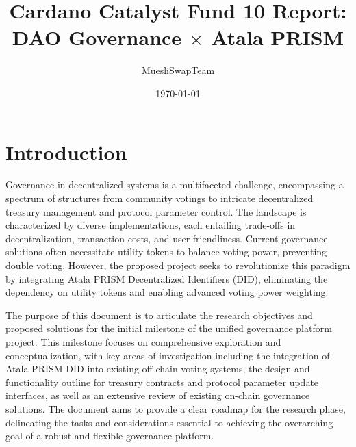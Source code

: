 \documentclass[11pt]{article}
\title{Cardano Catalyst Fund 10 Report:\\DAO Governance $\times$ Atala PRISM}
\author{MuesliSwapTeam}
\date{\today}
\begin{document}
\maketitle
\vspace{10em}
\tableofcontents
\newpage

\section{Introduction}
Governance in decentralized systems is a multifaceted challenge, encompassing a spectrum of structures from community votings to intricate decentralized treasury management and protocol parameter control. The landscape is characterized by diverse implementations, each entailing trade-offs in decentralization, transaction costs, and user-friendliness. Current governance solutions often necessitate utility tokens to balance voting power, preventing double voting. However, the proposed project seeks to revolutionize this paradigm by integrating Atala PRISM Decentralized Identifiers (DID), eliminating the dependency on utility tokens and enabling advanced voting power weighting.

The purpose of this document is to articulate the research objectives and proposed solutions for the initial milestone of the unified governance platform project. This milestone focuses on comprehensive exploration and conceptualization, with key areas of investigation including the integration of Atala PRISM DID into existing off-chain voting systems, the design and functionality outline for treasury contracts and protocol parameter update interfaces, as well as an extensive review of existing on-chain governance solutions. The document aims to provide a clear roadmap for the research phase, delineating the tasks and considerations essential to achieving the overarching goal of a robust and flexible governance platform.
\end{document}
